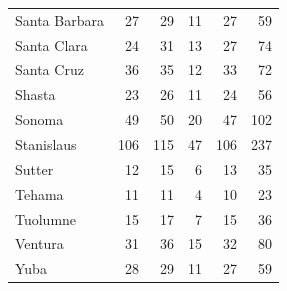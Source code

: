 \documentclass{asaproc}
\begin{document}
\begin{table}[p!]
\begin{tabular}{lrrrrr}
  Santa Barbara & 27 & 29 & 11 & 27 & 59 \\ 
  Santa Clara & 24 & 31 & 13 & 27 & 74 \\ 
  Santa Cruz & 36 & 35 & 12 & 33 & 72 \\ 
  Shasta & 23 & 26 & 11 & 24 & 56 \\ 
  Sonoma & 49 & 50 & 20 & 47 & 102 \\ 
  Stanislaus & 106 & 115 & 47 & 106 & 237 \\ 
  Sutter & 12 & 15 & 6 & 13 & 35 \\ 
  Tehama & 11 & 11 & 4 & 10 & 23 \\ 
  Tuolumne & 15 & 17 & 7 & 15 & 36 \\ 
  Ventura & 31 & 36 & 15 & 32 & 80 \\ 
  Yuba & 28 & 29 & 11 & 27 & 59 \\ 
   \hline
\end{tabular}
\end{table}
\end{document}

